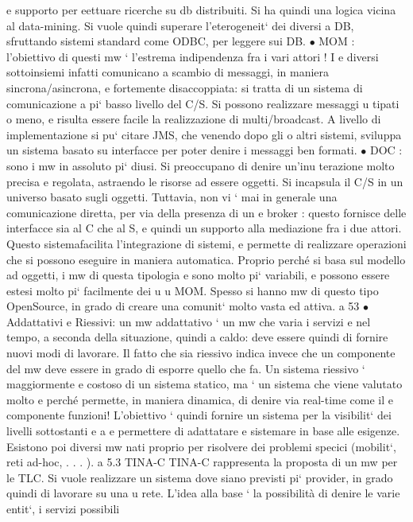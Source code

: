 \documentclass[a4paper,12pt]{article}
\begin{document}
e
supporto per eettuare ricerche su db distribuiti. Si ha quindi una logica
vicina al data-mining. Si vuole quindi superare l'eterogeneit` dei diversi
a
DB, sfruttando sistemi standard come ODBC, per leggere sui DB.
$\bullet$ MOM : l'obiettivo di questi mw ` l'estrema indipendenza fra i vari attori ! I
e
diversi sottoinsiemi infatti comunicano a scambio di messaggi, in maniera
sincrona/asincrona, e fortemente disaccoppiata: si tratta di un sistema di
comunicazione a pi` basso livello del C/S. Si possono realizzare messaggi
u
tipati o meno, e risulta essere facile la realizzazione di multi/broadcast.
A livello di implementazione si pu` citare JMS, che venendo dopo gli
o
altri sistemi, sviluppa un sistema basato su interfacce per poter denire i
messaggi ben formati.
$\bullet$ DOC : sono i mw in assoluto pi` diusi. Si preoccupano di denire un'inu
terazione molto precisa e regolata, astraendo le risorse ad essere oggetti.
Si incapsula il C/S in un universo basato sugli oggetti. Tuttavia, non vi
` mai in generale una comunicazione diretta, per via della presenza di un
e
broker : questo fornisce delle interfacce sia al C che al S, e quindi un supporto alla mediazione fra i due attori.
Questo sistemafacilita l'integrazione
di sistemi, e permette di realizzare operazioni che si possono eseguire in
maniera automatica.
Proprio perché si basa sul modello ad oggetti, i mw di questa tipologia
e
sono molto pi` variabili, e possono essere estesi molto pi` facilmente dei
u
u
MOM. Spesso si hanno mw di questo tipo OpenSource, in grado di creare
una comunit` molto vasta ed attiva.
a
53
\newpage
$\bullet$ Addattativi e Riessivi: un mw addattativo ` un mw che varia i servizi
e
nel tempo, a seconda della situazione, quindi a caldo: deve essere quindi
di fornire nuovi modi di lavorare.
Il fatto che sia riessivo indica invece che un componente del mw deve essere in grado di esporre quello che fa. Un
sistema riessivo ` maggiormente
e
costoso di un sistema statico, ma ` un sistema che viene valutato molto
e
perché permette, in maniera dinamica, di denire via real-time come il
e
componente funzioni!
L'obiettivo ` quindi fornire un sistema per la visibilit` dei livelli sottostanti
e
a
e permettere di adattatare e sistemare in base alle esigenze.
Esistono poi diversi mw nati proprio per risolvere dei problemi specici (mobilit`, reti ad-hoc, . . . ).
a
5.3
TINA-C
TINA-C rappresenta la proposta di un mw per le TLC. Si vuole realizzare un
sistema dove siano previsti pi` provider, in grado quindi di lavorare su una
u
rete. L'idea alla base ` la possibilità di denire le varie entit`, i servizi possibili
\end{document}
